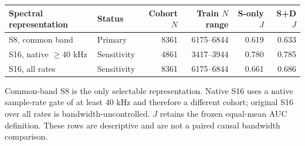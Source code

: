 \begin{tabular}{llrrrr}
\toprule
Spectral representation & Status & Cohort $N$ & Train $N$ range & S-only $J$ & S+D $J$ \\
\midrule
S8, common band & Primary & 8361 & 6175--6844 & 0.619 & 0.633 \\
S16, native $\geq 40$ kHz & Sensitivity & 4861 & 3417--3944 & 0.780 & 0.785 \\
S16, all rates & Sensitivity & 8361 & 6175--6844 & 0.661 & 0.686 \\
\bottomrule
\end{tabular}
\par\smallskip
{\footnotesize Common-band S8 is the only selectable representation. Native S16 uses a native sample-rate gate of at least 40 kHz and therefore a different cohort; original S16 over all rates is bandwidth-uncontrolled. $J$ retains the frozen equal-mean AUC definition. These rows are descriptive and are not a paired causal bandwidth comparison.}
